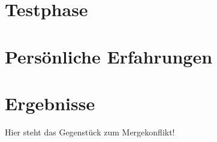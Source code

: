 \chapter{Testphase}
\renewcommand{\kapitelautor}{}

\chapter{Persönliche Erfahrungen}

\chapter{Ergebnisse}

Hier steht das Gegenstück zum Mergekonflikt!
